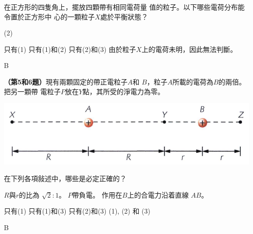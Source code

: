 {
    在正方形的四隻角上，擺放四顆帶有相同電荷量 值的粒子。以下哪些電荷分布能令置於正方形中 心的一顆粒子$X$處於平衡狀態？
    \begin{statements}(2)
        \task {}
        \task {}
        \task {}
    \end{statements}
    \begin{tasks}
        \task 只有(1)
        \task 只有(1)和(2)
        \task 只有(2)和(3)
        \task 由於粒子$X$上的電荷未明，因此無法判斷。
    \end{tasks}
}{B}

{
    \textbf{（第5和6題）}現有兩顆固定的帶正電粒子$A$和 $B$，粒子$A$所載的電荷為$B$的兩倍。把另一顆帶 電粒子$P$放在$Y$點，其所受的淨電力為零。
    \par{\par\centering\includegraphics[width=.5\textwidth]{./img/ch1_electrostatics_mc_2024-06-18-17-12-00.png}\par}
    在下列各項敍述中，哪些是必定正確的？

    \begin{statements}
        \task $R$與$r$的比為 $\sqrt{2}:1$。
        \task $P$帶負電。
        \task 作用在$B$上的合電力沿着直線 $AB$。
    \end{statements}
    \begin{tasks}
        \task 只有(1)
        \task 只有(1)和(3)
        \task 只有(2)和(3)
        \task (1), (2) 和 (3)
    \end{tasks}
}{B}

